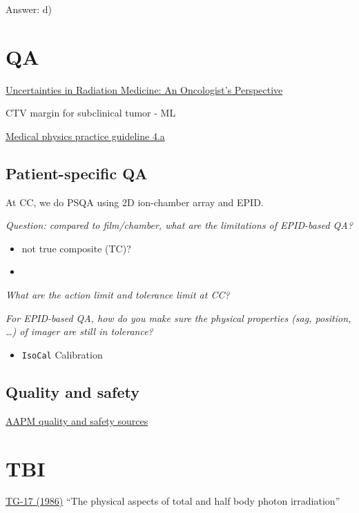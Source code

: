 \documentclass[]{book}
\providecommand{\tightlist}{%
  \setlength{\itemsep}{0pt}\setlength{\parskip}{0pt}}
\theoremstyle{definition}
\theoremstyle{definition}
\theoremstyle{definition}
\theoremstyle{remark}
\begin{document}
Answer: d)

\chapter{QA}\label{qa}

\href{https://vimeo.com/76862861}{Uncertainties in Radiation Medicine:
An Oncologist's Perspective}

CTV margin for subclinical tumor - ML

\href{https://aapm.onlinelibrary.wiley.com/doi/full/10.1120/jacmp.v16i3.5431}{Medical
physics practice guideline 4.a}

\section{Patient-specific QA}\label{patient-specific-qa}

At CC, we do PSQA using 2D ion-chamber array and EPID.

\emph{Question: compared to film/chamber, what are the limitations of
EPID-based QA?}

\begin{itemize}
\item
  not true composite (TC)?
\item
\end{itemize}

\emph{What are the action limit and tolerance limit at CC?}

\emph{For EPID-based QA, how do you make sure the physical properties
(sag, position, \ldots{}) of imager are still in tolerance?}

\begin{itemize}
\tightlist
\item
  \texttt{IsoCal} Calibration
\end{itemize}

\section{Quality and safety}\label{quality-and-safety}

\href{https://www.aapm.org/QualitySafety/default.asp}{AAPM quality and
safety sources}

\chapter{TBI}\label{tbi}

\href{https://aapm.org/pubs/reports/RPT_17.pdf}{TG-17 (1986)} ``The
physical aspects of total and half body photon irradiation''
\end{document}
